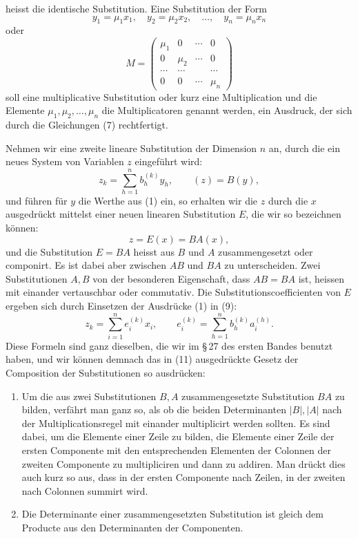 \documentclass[11pt]{article}
\begin{document}
heisst die identische Substitution. Eine Substitution der Form
\begin{equation}
y_1=\mu_1x_1,\quad y_2=\mu_2x_2,\quad\ldots,\quad y_n=\mu_nx_n
\tag{7}
\end{equation}
oder
\begin{equation}
M=\begin{pmatrix}
\mu_1&0&\cdots&0\\
0&\mu_2&\cdots&0\\
\cdots&\cdots&&\cdots\\
0&0&\cdots&\mu_n
\end{pmatrix}
\tag{8}
\end{equation}
soll eine multiplicative Substitution oder kurz eine Multiplication und die Elemente $\mu_1,\mu_2,\ldots,\mu_n$ die Multiplicatoren genannt werden, ein Ausdruck, der sich durch die Gleichungen (7) rechtfertigt.

Nehmen wir eine zweite lineare Substitution der Dimension $n$ an, durch die ein neues System von Variablen $z$ eingeführt wird:
\begin{equation}
z_k=\sum_{h=1}^{n}b_h^{(k)}y_h,\qquad (z)=B(y),
\tag{9}
\end{equation}
und führen für $y$ die Werthe aus (1) ein, so erhalten wir die $z$ durch die $x$ ausgedrückt mittelst einer neuen linearen Substitution $E$, die wir so bezeichnen können:
\begin{equation}
z=E(x)=BA(x),
\tag{10}
\end{equation}
und die Substitution $E=BA$ heisst aus $B$ und $A$ zusammengesetzt oder componirt. Es ist dabei aber zwischen $AB$ und $BA$ zu unterscheiden. Zwei Substitutionen $A,B$ von der besonderen Eigenschaft, dass $AB=BA$ ist, heissen mit einander vertauschbar oder commutativ. Die Substitutionscoefficienten von $E$ ergeben sich durch Einsetzen der Ausdrücke (1) in (9):
\begin{equation}
z_k=\sum_{i=1}^{n}e_i^{(k)}x_i,
\qquad
 e_i^{(k)}=\sum_{h=1}^{n}b_h^{(k)}a_i^{(h)}.
\tag{11}
\end{equation}
Diese Formeln sind ganz dieselben, die wir im \S\,27 des ersten Bandes benutzt haben, und wir können demnach das in (11) ausgedrückte Gesetz der Composition der Substitutionen so ausdrücken:

\begin{enumerate}[label=\arabic*.,leftmargin=2.2em]
\item Um die aus zwei Substitutionen $B,A$ zusammengesetzte Substitution $BA$ zu bilden, verfährt man ganz so, als ob die beiden Determinanten $|B|, |A|$ nach der Multiplicationsregel mit einander multiplicirt werden sollten. Es sind dabei, um die Elemente einer Zeile zu bilden, die Elemente einer Zeile der ersten Componente mit den entsprechenden Elementen der Colonnen der zweiten Componente zu multipliciren und dann zu addiren. Man drückt dies auch kurz so aus, dass in der ersten Componente nach Zeilen, in der zweiten nach Colonnen summirt wird.

\item Die Determinante einer zusammengesetzten Substitution ist gleich dem Producte aus den Determinanten der Componenten.
\end{enumerate}
\end{document}

